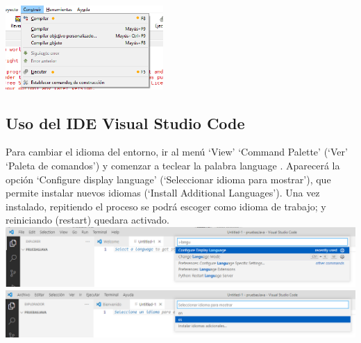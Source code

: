 \documentclass[spanish,12pt,a4paper,final,oneside]{book}
\begin{document}
\includegraphics[width=0.45\textwidth]{Geany - compilar y ejecutar - menu}


\subsection{Uso del IDE Visual Studio Code}

Para cambiar el idioma del entorno, ir al menú `View' `Command Palette' (`Ver' `Paleta de comandos') y comenzar a teclear la palabra language . Aparecerá la opción `Configure display language' (`Seleccionar idioma para mostrar'), que permite instalar nuevos idiomas (`Install Additional Languages'). Una vez instalado, repitiendo el proceso se podrá escoger como idioma de trabajo; y reiniciando (restart) quedara activado.
\\\includegraphics[width=\textwidth]{VScode - choose language}
\\\includegraphics[width=\textwidth]{VScode - elegir idioma}
\end{document}
